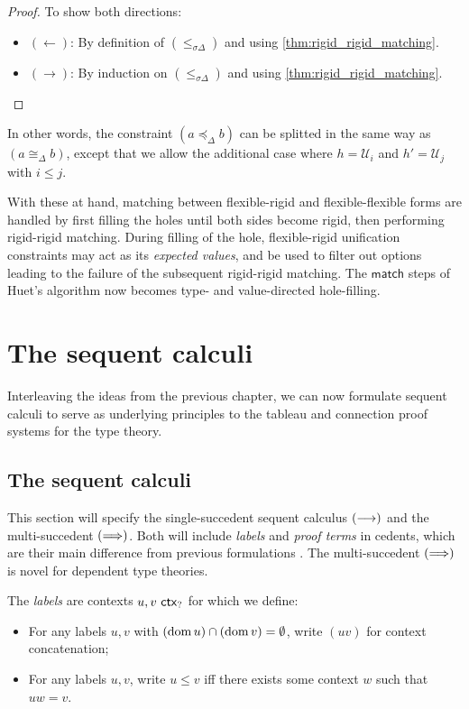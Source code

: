 \documentclass[twoside]{report}
\begin{document}
\begin{proof}
To show both directions:
\begin{itemize}[noitemsep]
    \item $(\leftarrow)$: By definition of $(\leq_{\sigma \Delta})$ and using \cref{thm:rigid_rigid_matching}.
    \item $(\rightarrow)$: By induction on $(\leq_{\sigma \Delta})$ and using \cref{thm:rigid_rigid_matching}. \qedhere
\end{itemize}
\end{proof}

In other words, the constraint $(a \preceq_\Delta b)$ can be splitted in the same way as $(a \cong_\Delta b)$, except that we allow the additional case where $h = \mathcal U_i$ and $h' = \mathcal U_j$ with $i \leq j$.

With these at hand, matching between flexible-rigid and flexible-flexible forms are handled by first filling the holes until both sides become rigid, then performing rigid-rigid matching. During filling of the hole, flexible-rigid unification constraints may act as its \emph{expected values}, and be used to filter out options leading to the failure of the subsequent rigid-rigid matching. The $\mathsf{match}$ steps of Huet's algorithm now becomes type- and value-directed hole-filling.

\chapter{The sequent calculi}
\label{sec:sequent_calculi}

Interleaving the ideas from the previous chapter, we can now formulate sequent calculi to serve as underlying principles to the tableau and connection proof systems for the type theory.

\section{The sequent calculi}
\label{sec:sequent_calculi_spec}

This section will specify the single-succedent sequent calculus $(\longrightarrow)$ and the multi-succedent $(\Longrightarrow)$. Both will include \emph{labels} and \emph{proof terms} in cedents, which are their main difference from previous formulations \cite{pym1990proofs}. The multi-succedent $(\Longrightarrow)$ is novel for dependent type theories.

\begin{definition}[Labels]
\label{def:labels}
The \emph{labels} are contexts $u, v \ \mathsf{ctx}_{?}$ for which we define:
\begin{itemize}[noitemsep]
    \item For any labels $u, v$ with $(\operatorname{dom} u) \cap (\operatorname{dom} v) = \emptyset$, write $(uv)$ for context concatenation;
    \item For any labels $u, v$, write $u \leq v$ iff there exists some context $w$ such that $uw = v$.
\end{itemize}
\end{definition}
\end{document}
